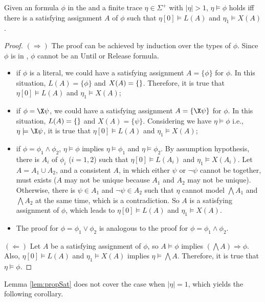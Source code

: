 \begin{lemma}\label{lem:propSat}
Given an \ltlf formula $\phi$ in the \XNF and a finite trace $\eta\in\Sigma^+$ with $|\eta|>1$, $\eta\models\phi$ holds iff there is a satisfying assignment $A$ of $\phi$ such that $\eta[0]\models L(A)$ and $\eta_1\models X(A)$.
\end{lemma}
\begin{proof}
$(\Rightarrow)$ The proof can be achieved by induction over the types of $\phi$. Since $\phi$ is in \XNF, $\phi$ cannot be an Until or Release formula.
\begin{itemize}
	\item if $\phi$ is a literal,  we could have a satisfying assignment $A=\{\phi\}$ for $\phi$. In this situation, $L(A)=\{\phi\}$ and $X(A)=\{\tt\}$. Therefore, it is true that $\eta[0]\models L(A)$ and $\eta_1\models X(A)$;
	\item if $\phi=\X\psi$, we could have a satisfying assignment $A=\{\X\psi\}$ for $\phi$. In this situation, $L(A)=\{\tt\}$ and $X(A)=\{\psi\}$. Considering we have $\eta\models\phi$ i.e., $\eta\models\X\psi$, it is true that $\eta[0]\models L(A)$ and $\eta_1\models X(A)$;
	\item if $\phi = \phi_1\wedge\phi_2$, $\eta\models\phi$ 
implies $\eta\models\phi_1$ and $\eta\models\phi_2$. By assumption hypothesis, there is $A_i$ of $\phi_i$ ($i=1,2$) such that 
$\eta[0]\models L(A_i)$ and $\eta_1\models X(A_i)$. Let $A = A_1\cup A_2$, and a consistent $A$, in which either $\psi$ or $\neg \psi$ cannot be together, 
must exists ($A$ may not be unique because $A_1$ and $A_2$ may not be unique). 
Otherwise, there is $\psi\in A_1$ and $\neg\psi\in A_2$ 
such that $\eta$ cannot model $\bigwedge A_1$ and $\bigwedge A_2$ at the same time, which is a contradiction. So $A$ is a satisfying  assignment of $\phi$, which leads to $\eta[0]\models L(A)$ and $\eta_1\models X(A)$. 
\item The proof for $\phi=\phi_1\vee\phi_2$ is analogous to the proof for $\phi = \phi_1\wedge\phi_2$.
\end{itemize} 

$(\Leftarrow)$ Let $A$ be a satisfying assignment of $\phi$, so $A\models\phi$ implies $(\bigwedge A)\Rightarrow \phi$. 
Also, $\eta[0]\models L(A)$ and $\eta_1\models X(A)$ implies $\eta\models \bigwedge A$. Therefore, it is true that $\eta\models \phi$.
\end{proof}

Lemma \ref{lem:propSat} does not cover the case when $|\eta|=1$, which yields the following corollary. 

